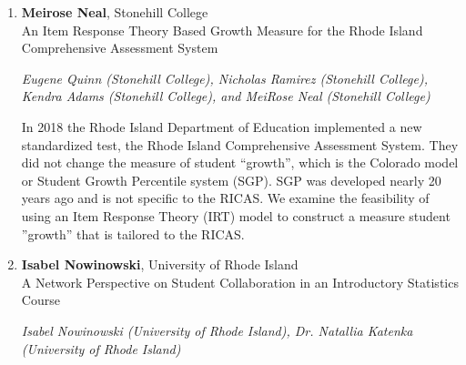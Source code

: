 \begin{enumerate}
\item \textbf{Meirose Neal}, Stonehill College \\
An Item Response Theory Based Growth Measure for the Rhode Island Comprehensive Assessment System

\emph{\footnotesize Eugene Quinn (Stonehill College), Nicholas Ramirez (Stonehill College), Kendra Adams (Stonehill College), and MeiRose Neal (Stonehill College)}

In 2018 the Rhode Island Department of Education implemented a new standardized test, the Rhode Island Comprehensive Assessment System.  They did not change the measure of student ``growth'', which is the Colorado model or Student Growth Percentile system (SGP). SGP was developed nearly 20 years ago and is not specific to the RICAS. We examine the feasibility of using an Item Response Theory (IRT) model to construct a measure student ''growth'' that is tailored to the RICAS.

\item \textbf{Isabel Nowinowski}, University of Rhode Island \\
A Network Perspective on Student Collaboration in an Introductory Statistics Course

\emph{\footnotesize Isabel Nowinowski (University of Rhode Island), Dr. Natallia Katenka (University of Rhode Island)}


\end{enumerate}
